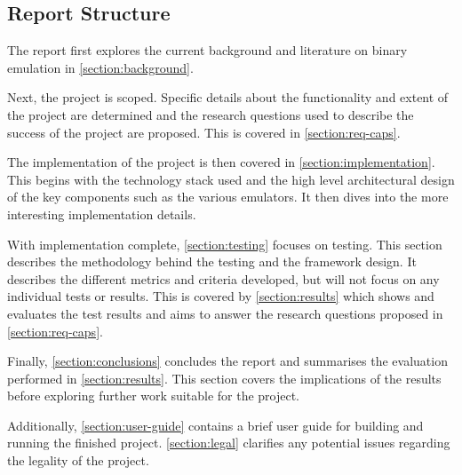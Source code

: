 \subsection{Report Structure}

The report first explores the current background and literature on binary emulation in \autoref{section:background}.

Next, the project is scoped. Specific details about the functionality and extent of the project are determined and the research questions used to describe the success of the project are proposed. This is covered in \autoref{section:req-caps}.

The implementation of the project is then covered in \autoref{section:implementation}. This begins with the technology stack used and the high level architectural design of the key components such as the various emulators. It then dives into the more interesting implementation details.

With implementation complete, \autoref{section:testing} focuses on testing. This section describes the methodology behind the testing and the framework design. It describes the different metrics and criteria developed, but will not focus on any individual tests or results. This is covered by \autoref{section:results} which shows and evaluates the test results and aims to answer the research questions proposed in \autoref{section:req-caps}.

Finally, \autoref{section:conclusions} concludes the report and summarises the evaluation performed in \autoref{section:results}. This section covers the implications of the results before exploring further work suitable for the project.

Additionally, \autoref{section:user-guide} contains a brief user guide for building and running the finished project. \autoref{section:legal} clarifies any potential issues regarding the legality of the project.